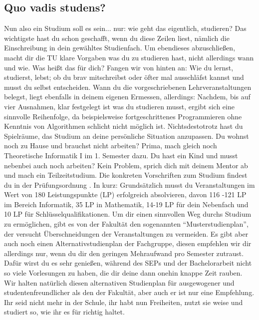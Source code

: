 \subsection{Quo vadis studens?}

Nun also ein Studium soll es sein... nur: wie geht das eigentlich, studieren?
Das wichtigste hast du schon geschafft, wenn du diese Zeilen liest, nämlich die Einschreibung in dein gewähltes Studienfach. 
Um ebendieses abzuschließen, macht dir die TU klare Vorgaben was du zu studieren hast, nicht allerdings wann und wie. Was heißt das für dich?
Fangen wir von hinten an: 
Wie du lernst, studierst, lebst; ob du brav mitschreibst oder öfter mal ausschläfst kannst und musst du selbst entscheiden.
Wann du die vorgeschriebenen Lehrveranstaltungen belegst, liegt ebenfalls in deinem eigenen Ermessen, allerdings:
Nachdem, bis auf vier Ausnahmen, klar festgelegt ist was du studieren musst, ergibt sich eine sinnvolle Reihenfolge, da beispielsweise fortgeschrittenes Programmieren ohne Kenntnis von Algorithmen schlicht nicht möglich ist. Nichtsdestotrotz hast du Spielräume, das Studium an deine persönliche Situation anzupassen.    
Du wohnst noch zu Hause und brauchst nicht arbeiten? Prima, mach gleich noch Theoretische Informatik I im 1. Semester dazu.
Du hast ein Kind und musst nebenbei auch noch arbeiten? Kein Problem, sprich dich mit deinem Mentor ab und mach ein Teilzeitstudium.
Die konkreten Vorschriften zum Studium findest du in der Prüfungsordnung 
.
In kurz: Grundsätzlich musst du Veranstaltungen im Wert von 180 Leistungspunkte (LP) erfolgreich absolvieren, davon 116 -121 LP im Bereich Informatik, 35 LP in Mathematik, 14-19 LP für dein Nebenfach und 10 LP für Schlüsselqualifikationen.
Um dir einen sinnvollen Weg durchs Studium zu ermöglichen, gibt es von der Fakultät den sogenannten “Musterstudienplan”, der versucht Überschneidungen der Veranstaltungen zu vermeiden. 
Es gibt aber auch noch einen Alternativstudienplan der Fachgruppe, diesen empfehlen wir dir allerdings nur, wenn du dir den geringen Mehraufwand pro Semester zutraust. Dafür wirst du es sehr genießen, während des SEPs und der Bachelorarbeit nicht so viele Vorlesungen zu haben, die dir deine dann onehin knappe Zeit rauben.
Wir halten natürlich diesen alternativen Studienplan für ausgewogener und
studentenfreundlicher als den der Fakultät, aber auch er ist nur eine Empfehlung. 
Ihr seid nicht mehr in der Schule, ihr habt nun Freiheiten, nutzt sie weise und studiert so, wie ihr es für richtig haltet.



